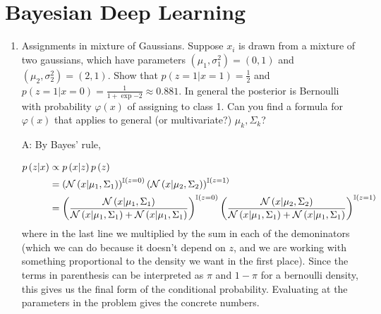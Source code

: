 \documentclass{article}
\begin{document}
\section{Bayesian Deep Learning}

\begin{enumerate}

\item Assignments in mixture of Gaussians. Suppose $x_i$ is drawn from a mixture
  of two gaussians, which have parameters $\left(\mu_{1}, \sigma_{1}^2\right) =
  \left(0, 1\right)$ and $\left(\mu_{2}, \sigma_{2}^{2}\right) = \left(2,
  1\right)$. Show that $p\left(z = 1\vert x = 1\right) = \frac{1}{2}$ and
  $p\left(z = 1 \vert x = 0\right) = \frac{1}{1 + \exp{-2}} \approx 0.881$. In
  general the posterior is Bernoulli with probability $\varphi\left(x\right)$ of
  assigning to class 1. Can you find a formula for $\varphi\left(x\right)$ that
  applies to general (or multivariate?) $\mu_{k}, \Sigma_{k}$?

  A: By Bayes' rule,

  \begin{align*}
    p\left(z \vert x\right) &\propto p\left(x \vert z\right)p\left(z\right)\\
    &= \left(\mathcal{N}\left(x \vert \mu_1, \Sigma_1\right)\right)^{\mathbb{I}\left({z = 0}\right)}
    \left(\mathcal{N}\left(x \vert \mu_2, \Sigma_2\right)\right)^{\mathbb{I}\left({z = 1}\right)} \\
    &= \left(\frac{\mathcal{N}\left(x \vert \mu_1, \Sigma_1\right)}{\mathcal{N}\left(x \vert \mu_1, \Sigma_1\right) + \mathcal{N}\left(x \vert \mu_1, \Sigma_1\right)} \right)^{\mathbb{I}\left({z = 0}\right)}
    \left(\frac{\mathcal{N}\left(x \vert \mu_2, \Sigma_2\right)}{\mathcal{N}\left(x \vert \mu_1, \Sigma_1\right) + \mathcal{N}\left(x \vert \mu_1, \Sigma_1\right)} \right)^{\mathbb{I}\left({z = 1}\right)}
  \end{align*}
  where in the last line we multiplied by the sum in each of the demoninators
  (which we can do because it doesn't depend on $z$, and we are working with
  something proportional to the density we want in the first place). Since the
  terms in parenthesis can be interpreted as $\pi$ and $1 - \pi$ for a bernoulli
  density, this gives us the final form of the conditional probability.
  Evaluating at the parameters in the problem gives the concrete numbers.


\end{enumerate}
\end{document}
